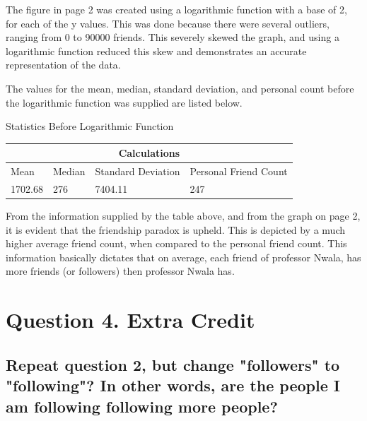 \documentclass[11pt]{scrartcl} %
\begin{document}
\tabto{2.0 cm}The figure in page 2 was created using a logarithmic function with a base of 2, for each of the y values. This was done because there were several outliers, ranging from 0 to 90000 friends. This severely skewed the graph, and using a logarithmic function reduced this skew and demonstrates an accurate representation of the data. 
\newline \newline

\tabto{2.0cm} The values for the mean, median, standard deviation, and personal count before the logarithmic function was supplied are listed below.
\bigskip \bigskip
\begin{center}
\begin{LARGE} Statistics Before Logarithmic Function  \end{LARGE} \newline \newline
\begin{tabular}{ |p{1cm}||p{1cm}|p{6cm}|p{6cm}|  }
 \hline
 \multicolumn{4}{|c|}{Calculations} \\
 \hline
 Mean & Median & Standard Deviation & Personal Friend Count\\
 \hline
1702.68   & 276   & 7404.11 & 247 \\
 \hline
\end{tabular}
\end{center}

\bigskip \bigskip

\tabto{2.0cm} From the information supplied by the table above, and from the graph on page 2, it is evident that the friendship paradox is upheld. This is depicted by a much higher average friend count, when compared to the personal friend count. This information basically dictates that on average, each friend of professor Nwala, has more friends (or followers) then professor Nwala has. 

\pagebreak

\section*{Question 4. Extra Credit}


\subsection*{Repeat question 2, but change "followers" to "following"?  In
other words, are the people I am following following more people?}
\end{document}
